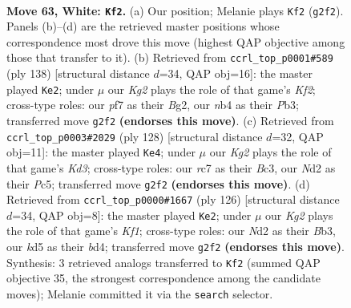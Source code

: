 \documentclass[11pt]{article}
\begin{document}
\clearpage

\begin{figure}[p]\centering
\begin{subfigure}{0.46\textwidth}\centering
\resizebox{\linewidth}{!}{%
\newchessgame
\chessboard[
  setfen={8/2r2p1p/6p1/3kP3/bn3Pp1/8/3N2KP/1B6 w - - 16 63},
  showmover=false,
  pgfstyle=straightmove, color=movearrow, markmove={g2-f2}
]}
\caption{}
\end{subfigure}\hfill
\begin{subfigure}{0.46\textwidth}\centering
\resizebox{\linewidth}{!}{%
\newchessgame
\chessboard[
  setfen={2k5/8/1p6/2p1B3/P1P2p1r/1P6/5KB1/8 w - - 18 70},
  showmover=false,
  pgfstyle=straightmove, color=movearrow, markmove={f2-e2}
]}
\caption{}
\end{subfigure}
\\[4pt]
\begin{subfigure}{0.46\textwidth}\centering
\resizebox{\linewidth}{!}{%
\newchessgame
\chessboard[
  setfen={8/6p1/2n1kp1p/1pP4P/1P4P1/2BK4/8/8 w - - 5 65},
  showmover=false,
  pgfstyle=straightmove, color=movearrow, markmove={d3-e4}
]}
\caption{}
\end{subfigure}\hfill
\begin{subfigure}{0.46\textwidth}\centering
\resizebox{\linewidth}{!}{%
\newchessgame
\chessboard[
  setfen={2n5/2B1k3/6p1/1P3p1p/3bp2P/1B4P1/5P2/5K2 w - - 4 64},
  showmover=false,
  pgfstyle=straightmove, color=movearrow, markmove={f1-e2}
]}
\caption{}
\end{subfigure}
\caption{\textbf{Move 63, White: \texttt{Kf2}.} (a) Our position; Melanie plays \texttt{Kf2} (\texttt{g2f2}). Panels (b)--(d) are the retrieved master positions whose correspondence most drove this move (highest QAP objective among those that transfer to it). (b) Retrieved from \texttt{ccrl\_top\_p0001\#589} (ply 138) [structural distance $d$=34, QAP obj=16]: the master played \texttt{Ke2}; under $\mu$ our \emph{Kg2} plays the role of that game's \emph{Kf2}; cross-type roles: our \emph{p}f7 as their \emph{B}g2, our \emph{n}b4 as their \emph{P}b3; transferred move \texttt{g2f2} \textbf{(endorses this move)}. (c) Retrieved from \texttt{ccrl\_top\_p0003\#2029} (ply 128) [structural distance $d$=32, QAP obj=11]: the master played \texttt{Ke4}; under $\mu$ our \emph{Kg2} plays the role of that game's \emph{Kd3}; cross-type roles: our \emph{r}c7 as their \emph{B}c3, our \emph{N}d2 as their \emph{P}c5; transferred move \texttt{g2f2} \textbf{(endorses this move)}. (d) Retrieved from \texttt{ccrl\_top\_p0000\#1667} (ply 126) [structural distance $d$=34, QAP obj=8]: the master played \texttt{Ke2}; under $\mu$ our \emph{Kg2} plays the role of that game's \emph{Kf1}; cross-type roles: our \emph{N}d2 as their \emph{B}b3, our \emph{k}d5 as their \emph{b}d4; transferred move \texttt{g2f2} \textbf{(endorses this move)}. Synthesis: 3 retrieved analogs transferred to \texttt{Kf2} (summed QAP objective 35, the strongest correspondence among the candidate moves); Melanie committed it via the \texttt{search} selector.}
\label{fig:thought-m124}
\end{figure}
\end{document}
